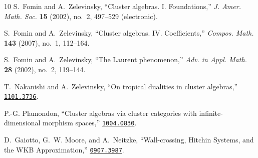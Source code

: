 \documentclass[12pt,reqno]{article}
\numberwithin{equation}{section}
\numberwithin{equation}{section}
\begin{document}
\begin{thebibliography}{10}
S.~Fomin and A.~Zelevinsky, ``Cluster algebras. {I}. {F}oundations,'' {\em J.
  Amer. Math. Soc.} {\bf 15} (2002), no.~2, 497--529 (electronic).

S.~Fomin and A.~Zelevinsky, ``Cluster algebras. {IV}. {C}oefficients,'' {\em
  Compos. Math.} {\bf 143} (2007), no.~1, 112--164.

S.~Fomin and A.~Zelevinsky, ``The {L}aurent phenomenon,'' {\em Adv. in Appl.
  Math.} {\bf 28} (2002), no.~2, 119--144.

T.~Nakanishi and A.~Zelevinsky, ``{On tropical dualities in cluster
  algebras},'' \href{http://www.arXiv.org/abs/1101.3736}{{\tt 1101.3736}}.

P.-G. Plamondon, ``{Cluster algebras via cluster categories with
  infinite-dimensional morphism spaces},''
\href{http://www.arXiv.org/abs/1004.0830}{{\tt 1004.0830}}.

D.~Gaiotto, G.~W. Moore, and A.~Neitzke, ``{Wall-crossing, Hitchin Systems, and
  the WKB Approximation},''
\href{http://www.arXiv.org/abs/0907.3987}{{\tt 0907.3987}}.

\end{thebibliography}\endgroup
\end{document}
